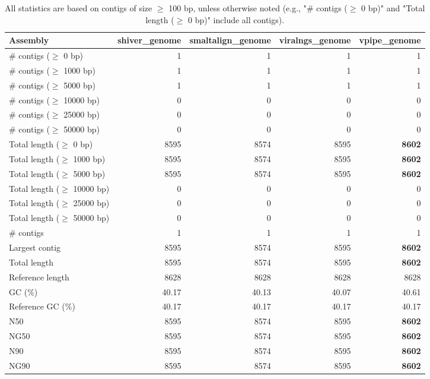 \documentclass[12pt,a4paper]{article}
\begin{document}
\begin{table}[ht]
\begin{center}
\caption{All statistics are based on contigs of size $\geq$ 100 bp, unless otherwise noted (e.g., "\# contigs ($\geq$ 0 bp)" and "Total length ($\geq$ 0 bp)" include all contigs).}
\begin{tabular}{|l*{4}{|r}|}
\hline
Assembly & shiver\_genome & smaltalign\_genome & viralngs\_genome & vpipe\_genome \\ \hline
\# contigs ($\geq$ 0 bp) & 1 & 1 & 1 & 1 \\ \hline
\# contigs ($\geq$ 1000 bp) & 1 & 1 & 1 & 1 \\ \hline
\# contigs ($\geq$ 5000 bp) & 1 & 1 & 1 & 1 \\ \hline
\# contigs ($\geq$ 10000 bp) & 0 & 0 & 0 & 0 \\ \hline
\# contigs ($\geq$ 25000 bp) & 0 & 0 & 0 & 0 \\ \hline
\# contigs ($\geq$ 50000 bp) & 0 & 0 & 0 & 0 \\ \hline
Total length ($\geq$ 0 bp) & 8595 & 8574 & 8595 & {\bf 8602} \\ \hline
Total length ($\geq$ 1000 bp) & 8595 & 8574 & 8595 & {\bf 8602} \\ \hline
Total length ($\geq$ 5000 bp) & 8595 & 8574 & 8595 & {\bf 8602} \\ \hline
Total length ($\geq$ 10000 bp) & 0 & 0 & 0 & 0 \\ \hline
Total length ($\geq$ 25000 bp) & 0 & 0 & 0 & 0 \\ \hline
Total length ($\geq$ 50000 bp) & 0 & 0 & 0 & 0 \\ \hline
\# contigs & 1 & 1 & 1 & 1 \\ \hline
Largest contig & 8595 & 8574 & 8595 & {\bf 8602} \\ \hline
Total length & 8595 & 8574 & 8595 & {\bf 8602} \\ \hline
Reference length & 8628 & 8628 & 8628 & 8628 \\ \hline
GC (\%) & 40.17 & 40.13 & 40.07 & 40.61 \\ \hline
Reference GC (\%) & 40.17 & 40.17 & 40.17 & 40.17 \\ \hline
N50 & 8595 & 8574 & 8595 & {\bf 8602} \\ \hline
NG50 & 8595 & 8574 & 8595 & {\bf 8602} \\ \hline
N90 & 8595 & 8574 & 8595 & {\bf 8602} \\ \hline
NG90 & 8595 & 8574 & 8595 & {\bf 8602} \\ \hline

\end{tabular}
\end{center}
\end{table}
\end{document}
